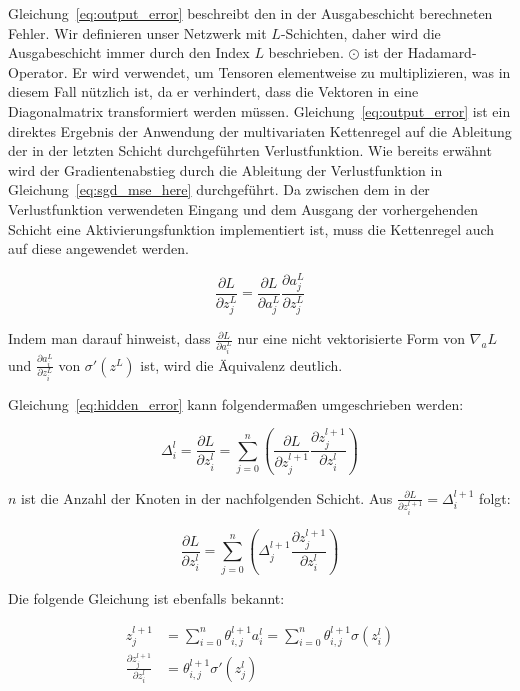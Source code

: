 Gleichung~\eqref{eq:output_error} beschreibt den in der Ausgabeschicht berechneten Fehler. Wir definieren unser Netzwerk mit $L$-Schichten, daher wird die Ausgabeschicht immer durch den Index $L$ beschrieben.
$\odot$ ist der Hadamard-Operator. Er wird verwendet, um Tensoren elementweise zu multiplizieren, was in diesem Fall nützlich ist, da er verhindert, dass die Vektoren in eine Diagonalmatrix transformiert werden müssen.
Gleichung~\eqref{eq:output_error} ist ein direktes Ergebnis der Anwendung der multivariaten Kettenregel auf die Ableitung der in der letzten Schicht durchgeführten Verlustfunktion.
Wie bereits erwähnt wird der Gradientenabstieg durch die Ableitung der Verlustfunktion in Gleichung~\eqref{eq:sgd_mse_here} durchgeführt.
Da zwischen dem in der Verlustfunktion verwendeten Eingang und dem Ausgang der vorhergehenden Schicht eine Aktivierungsfunktion implementiert ist, muss die Kettenregel auch auf diese angewendet werden.

\begin{equation}
    \frac{\partial L}{\partial z^L_j} = \frac{\partial L}{\partial a^L_j}\frac{\partial a^L_j}{\partial z^L_j}
    \label{eq:proof_loss_chain_rule}
\end{equation}

Indem man darauf hinweist, dass $\frac{\partial L}{\partial a^L_i}$ nur eine nicht vektorisierte Form von $\nabla_a L$ und $\frac{\partial a^L_i}{\partial z^L_i}$ von $\sigma'(z^L)$ ist, wird die Äquivalenz deutlich.

Gleichung~\eqref{eq:hidden_error} kann folgendermaßen umgeschrieben werden:

\begin{equation}
    \varDelta^l_i = \frac{\partial L}{\partial z^l_i} = \sum_{j=0}^n (\frac{\partial L}{\partial z^{l+1}_j}\frac{\partial z^{l+1}_j}{\partial z^l_i})
\end{equation}

$n$ ist die Anzahl der Knoten in der nachfolgenden Schicht. Aus $\frac{\partial L}{\partial z^{l+1}_i} = \varDelta^{l+1}_i$ folgt:

\begin{equation}
    \frac{\partial L}{\partial z^l_i} = \sum_{j=0}^n (\varDelta^{l+1}_j \frac{\partial z^{l+1}_j}{\partial z^{l}_i})
    \label{eq:hidden_error_intermediate}
\end{equation}

Die folgende Gleichung ist ebenfalls bekannt:

\begin{equation}
    \begin{split}
    z^{l+1}_j & = \sum_{i=0}^n \theta^{l+1}_{i,j} a^l_i = \sum_{i=0}^n \theta^{l+1}_{i, j} \sigma(z^l_i) \\
    \frac{\partial z_j^{l+1}}{\partial z_i^l} & = \theta^{l+1}_{i,j} \sigma'(z^l_j)
    \end{split}
\end{equation}

